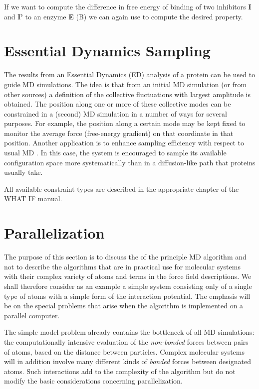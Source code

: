 If we want to compute the difference in free energy of binding of two
inhibitors {\bf I} and {\bf I'} to an enzyme {\bf E} (B)
we can again use  to compute the desired property.

\section{Essential Dynamics Sampling}
The results from an Essential Dynamics (ED) analysis \cite{Amadei93}
of a protein can be used to guide MD simulations. The idea is that
from an initial MD simulation (or from other sources) a definition of
the collective fluctuations with largest amplitude is obtained. The
position along one or more of these collective modes can be
constrained in a (second) MD simulation in a number of ways for
several purposes. For example, the position along a certain mode may
be kept fixed to monitor the average force (free-energy gradient) on
that coordinate in that position. Another application is to enhance
sampling efficiency with respect to usual MD
\cite{Degroot96a,Degroot96b}. In this case, the system is encouraged
to sample its available configuration space more systematically than
in a diffusion-like path that proteins usually take.

All available constraint types are described in the appropriate chapter
of the WHAT IF \cite{Whatif} manual.


\section{Parallelization}
\label{sec:par}

\newcommand{\abs}[1]{\mid \! {#1} \! \mid}

The purpose of this section is to discuss the 
 of the 
principle MD algorithm and not to describe the algorithms that are in 
practical use for molecular systems with their complex variety of atoms 
and terms in the force field descriptions. We shall therefore consider 
as an example a simple system consisting only of a single type of atoms 
with a simple form of the interaction potential. The emphasis will be 
on the special problems that arise when the algorithm is implemented on 
a parallel computer. 

The simple model problem already contains the bottleneck of all MD 
simulations: the computationally intensive evaluation of the 
{\em non-bonded} forces between pairs of atoms, based on the distance 
between particles. Complex molecular systems will in addition 
involve many different kinds of {\em bonded} forces between designated 
atoms. Such interactions add to the complexity of the algorithm but do 
not modify the basic considerations concerning parallelization.


